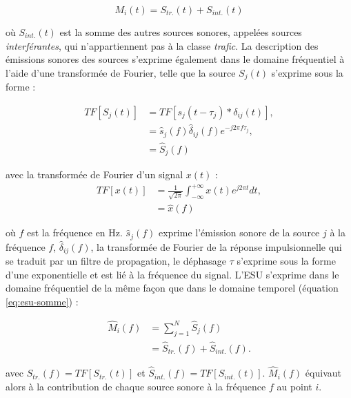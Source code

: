 \begin{equation}\label{eq:esu-somme}
M_i(t) = S_{tr.}(t)+S_{int.}(t)
\end{equation}

où $S_{int.}(t)$ est la somme des autres sources sonores, appelées sources \textit{interférantes}, qui n'appartiennent pas à la classe \textit{trafic}. 
La description des émissions sonores des sources s'exprime également dans le domaine fréquentiel à l'aide d'une transformée de Fourier, telle que la source $S_j(t)$ s'exprime sous la forme : 

\begin{subequations}
\begin{align}
TF\left[S_j(t)\right] & = TF\left[s_j(t-\tau_j) \ast \delta_{ij}(t) \right],\\
 & = \hat{s}_j(f)\hat{\delta}_{ij}(f)e^{-j2\pi f \tau_j},\\
 & = \hat{S}_j(f)
\end{align}
\end{subequations}

avec la transformée de Fourier d'un signal $x(t)$ : 
\begin{subequations}
\begin{align}
TF\left[x(t)\right] & = \frac{1}{\sqrt{2\pi}}\int_{-\infty}^{+\infty} x(t)e^{j2\pi t} dt, \\
 & = \hat{x}(f)
\end{align}
\end{subequations}

où $f$ est la fréquence en Hz. $\hat{s}_j(f)$ exprime l'émission sonore de la source $j$ à la fréquence $f$, $\hat{\delta}_{ij}(f)$, la transformée de Fourier de la réponse impulsionnelle qui se traduit par un filtre de propagation, le déphasage $\tau$ s'exprime sous la forme d'une exponentielle et est lié à la fréquence du signal. L'ESU s'exprime dans le domaine fréquentiel de la même façon que dans le domaine temporel (équation \ref{eq:esu-somme}) : 

\begin{align}
\hat{M}_i(f) &= \sum_{j = 1}^N \hat{S}_j(f)\\
 & =\hat{S}_{tr.}(f)+\hat{S}_{int.}(f).
\end{align}

avec $\hat{S}_{tr.}(f) = TF\left[ S_{tr.}(t)\right]$ et $\hat{S}_{int.}(f) = TF\left[ S_{int.}(t)\right]$. $\hat{M}_i(f)$ équivaut alors à la contribution de chaque source sonore à la fréquence $f$ au point $i$.\\

